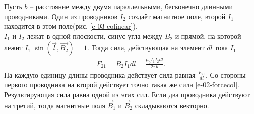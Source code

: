 \documentclass[__main__.tex]{subfiles}
\begin{document}
Пусть $b$ – расстояние между двумя параллельными, бесконечно длинными проводниками. Один из проводников $I_2$ создаёт магнитное поле, второй $I_1$ находится в этом поле(рис. \ref{e-03-colinear}).\\
$I_1$ и $I_2$ лежат в одной плоскости, синус угла между $B_2$ и прямой, на которой лежит $I_1$ $\sin{(\vec{l}, \vec{B_2})} = 1$. Тогда сила, действующая на элемент $dl$ тока $I_1$
\begin{gather}
	F_{21} = B_{2}I_{1}dl = \frac{\mu_0I_1I_2dl}{2\pi b}.
	\label{e-02-forcecol}
\end{gather}
На каждую единицу длины проводника действует сила равная $\frac{F_{21}}{dl}$. Со стороны первого проводника на второй действует точно такая же сила \ref{e-02-forcecol}.\\
Результирующая сила равна одной из этих сил. Если два проводника действуют на третий, тогда магнитные поля $\vec{B}_1$ и $\vec{B}_2$ складываются векторно.
\end{document}
